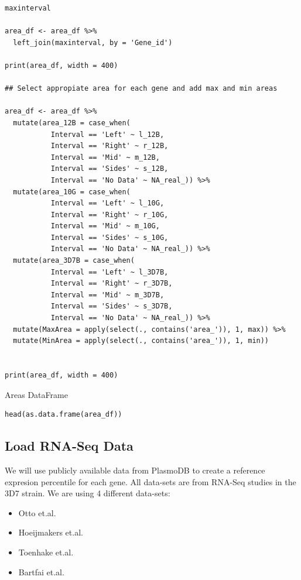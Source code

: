 \documentclass[11pt]{article}
\begin{document}
\begin{verbatim}
maxinterval

area_df <- area_df %>%
  left_join(maxinterval, by = 'Gene_id')

print(area_df, width = 400)

## Select appropiate area for each gene and add max and min areas

area_df <- area_df %>%
  mutate(area_12B = case_when(
           Interval == 'Left' ~ l_12B,
           Interval == 'Right' ~ r_12B,
           Interval == 'Mid' ~ m_12B,
           Interval == 'Sides' ~ s_12B,
           Interval == 'No Data' ~ NA_real_)) %>%
  mutate(area_10G = case_when(
           Interval == 'Left' ~ l_10G,
           Interval == 'Right' ~ r_10G,
           Interval == 'Mid' ~ m_10G,
           Interval == 'Sides' ~ s_10G,
           Interval == 'No Data' ~ NA_real_)) %>%
  mutate(area_3D7B = case_when(
           Interval == 'Left' ~ l_3D7B,
           Interval == 'Right' ~ r_3D7B,
           Interval == 'Mid' ~ m_3D7B,
           Interval == 'Sides' ~ s_3D7B,
           Interval == 'No Data' ~ NA_real_)) %>%
  mutate(MaxArea = apply(select(., contains('area_')), 1, max)) %>%
  mutate(MinArea = apply(select(., contains('area_')), 1, min))


print(area_df, width = 400)
\end{verbatim}

Areas DataFrame
\begin{verbatim}
head(as.data.frame(area_df))
\end{verbatim}

\subsection{Load RNA-Seq Data}
\label{sec:orgf9833ca}
We will use publicly available data from PlasmoDB to create a reference expresion percentile for each gene.
All data-sets are from RNA-Seq studies in the 3D7 strain.
We are using 4 different data-sets:
\begin{itemize}
\item Otto et.al.
\item Hoeijmakers et.al.
\item Toenhake et.al.
\item Bartfai et.al.
\end{itemize}
\end{document}
